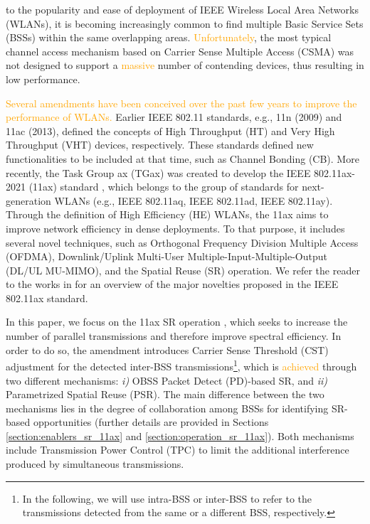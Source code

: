 \documentclass{ieeeaccess}
\begin{document}
 to the popularity and ease of deployment of IEEE Wireless Local Area Networks (WLANs), it is becoming increasingly common to find multiple Basic Service Sets (BSSs) within the same overlapping areas. \textcolor{orange}{Unfortunately}, the most typical channel access mechanism based on Carrier Sense Multiple Access (CSMA) was not designed to support a \textcolor{orange}{massive} number of contending devices, thus resulting in low performance.

\textcolor{orange}{Several amendments have been conceived over the past few years to improve the performance of WLANs.} Earlier IEEE 802.11 standards, e.g., 11n (2009) and 11ac (2013), defined the concepts of High Throughput (HT) and Very High Throughput (VHT) devices, respectively. These standards defined new functionalities to be included at that time, such as Channel Bonding (CB). More recently, the Task Group ax (TGax) was created to develop the IEEE 802.11ax-2021 (11ax) standard \cite{tgax2019draft}, which belongs to the group of standards for next-generation WLANs (e.g., IEEE 802.11aq, IEEE 802.11ad, IEEE 802.11ay). Through the definition of High Efficiency (HE) WLANs, the 11ax aims to improve network efficiency in dense deployments. To that purpose, it includes several novel techniques, such as Orthogonal Frequency Division Multiple Access (OFDMA), Downlink/Uplink Multi-User Multiple-Input-Multiple-Output (DL/UL MU-MIMO), and the Spatial Reuse (SR) operation. We refer the reader to the works in \cite{bellalta2016ieee, afaqui2016ieee, qu2018survey, khorov2018tutorial} for an overview of the major novelties proposed in the IEEE 802.11ax standard.

In this paper, we focus on the 11ax SR operation \cite{merlin2009methods}, which seeks to increase the number of parallel transmissions and therefore improve spectral efficiency. In order to do so, the amendment introduces Carrier Sense Threshold (CST) adjustment for the detected inter-BSS transmissions\footnote{In the following, we will use intra-BSS or inter-BSS to refer to the transmissions detected from the same or a different BSS, respectively.}, which is \textcolor{orange}{achieved} through two different mechanisms: \emph{i)} OBSS Packet Detect (PD)-based SR, and \emph{ii)} Parametrized Spatial Reuse (PSR). The main difference between the two mechanisms lies in the degree of collaboration among BSSs for identifying SR-based opportunities (further details are provided in Sections \ref{section:enablers_sr_11ax} and \ref{section:operation_sr_11ax}). Both mechanisms include Transmission Power Control (TPC) to limit the additional interference produced by simultaneous transmissions. 
\end{document}
